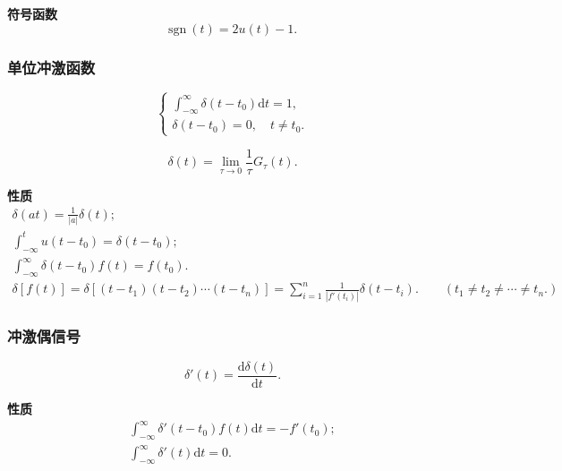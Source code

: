 \textbf{符号函数}
\begin{equation}
    \mathrm{sgn}\ (t)=2u(t)-1.
\end{equation}

\subsubsection{单位冲激函数}

\rmg
\begin{equation}
    \begin{cases}
        \displaystyle\int_{-\infty}^{\infty}\delta(t-t_0)\mathrm{d}t=1, \\
        \delta(t-t_0)=0,\quad t\neq t_0.
    \end{cases}
\end{equation}

\begin{equation}
    \delta(t)=\lim_{\tau\rightarrow 0}\frac{1}{\tau}G_\tau(t).
\end{equation}

\textbf{性质}
\begin{gather}
    \delta(at)=\frac{1}{|a|}\delta(t); \\
    \int_{-\infty}^{t}u(t-t_0)=\delta(t-t_0); \\
    \int_{-\infty}^{\infty}\delta(t-t_0)f(t)=f(t_0). \\
    \delta[f(t)]=\delta[(t-t_1)(t-t_2)\cdots(t-t_n)]=\sum_{i=1}^{n}\frac{1}{|f'(t_i)|}\delta(t-t_i).\qquad (t_1\neq t_2 \neq \cdots \neq t_n.)
\end{gather}

\subsubsection{冲激偶信号}

\rmg
\begin{equation}
    \delta'(t)=\frac{\mathrm{d}\delta(t)}{\mathrm{d}t}.
\end{equation}

\textbf{性质}
\begin{gather}
    \int_{-\infty}^{\infty}\delta'(t-t_0)f(t)\mathrm{d}t=-f'(t_0); \\
    \int_{-\infty}^{\infty}\delta'(t)\mathrm{d}t=0.
\end{gather}
